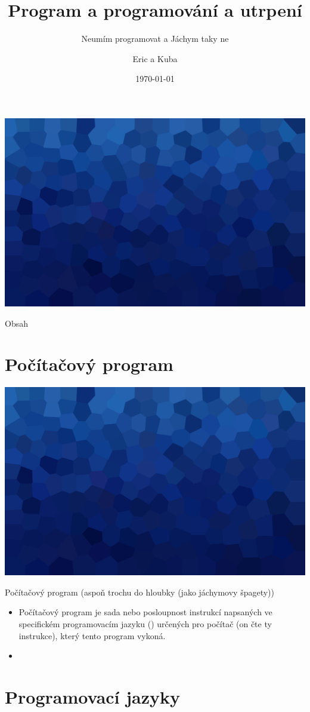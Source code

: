 \documentclass[aspectratio=169,xcolor=dvipsnames, t]{beamer}
\title[]{Program a programování a utrpení} %
\subtitle{Neumím programovat a Jáchym taky ne}
\author[Dusart]{Eric a Kuba}
\institute[GEVO]{Gymnázium Evolution Jižní Město}
\date{\today}
\begin{document}
\maketitlepage
{
{
    \includegraphics[width=\paperwidth,height=\paperheight]{AICStyleData/logos/mene_polygonu_bg.png}
}
\begin{frame}[t]{Obsah}
    \tableofcontents
\end{frame}
}


\section{Počítačový program}
{
{
    \includegraphics[width=\paperwidth,height=\paperheight]{AICStyleData/logos/mene_polygonu_bg.png}
}
\begin{frame}{Počítačový program (aspoň trochu do hloubky (jako jáchymovy špagety))}
    \begin{itemize}
        \item Počítačový program je sada nebo posloupnost instrukcí napsaných ve specifickém programovacím jazyku () určených pro počítač (on čte ty instrukce), který tento program vykoná.   
        \item  
    \end{itemize}
\end{frame}

\section{Programovací jazyky}
\begin{frame}
    
\end{frame}

}


\makefinalpage
\end{document}
